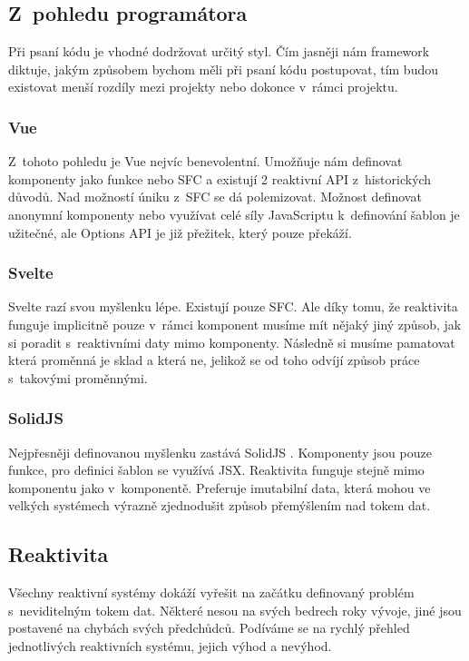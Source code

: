 \documentclass[
  master,
  program=ainf,
  tables=false,
  sourcecodes,
  glossaries,
  index
]{kidiplom}
\begin{document}
\subsection{Z~pohledu programátora}
Při psaní kódu je vhodné dodržovat určitý styl. Čím jasněji nám framework diktuje, jakým způsobem bychom
měli při psaní kódu postupovat, tím budou existovat menší rozdíly mezi projekty nebo dokonce v~rámci projektu.

\subsubsection{Vue}
Z~tohoto pohledu je Vue \cite{vue} nejvíc benevolentní. Umožňuje nám definovat komponenty jako funkce nebo SFC a existují
2 reaktivní API z~historických důvodů. Nad možností úniku z~SFC se dá polemizovat. Možnost definovat anonymní
komponenty nebo využívat celé síly JavaScriptu \cite{js} k~definování šablon je užitečné, ale Options API je již přežitek,
který pouze překáží. 

\subsubsection{Svelte}
Svelte \cite{svelte} razí svou myšlenku lépe. Existují pouze SFC. Ale díky tomu, že reaktivita funguje implicitně pouze v~rámci
komponent musíme mít nějaký jiný způsob, jak si poradit s~reaktivními daty mimo komponenty. Následně si musíme
pamatovat která proměnná je sklad a která ne, jelikož se od toho odvíjí způsob práce s~takovými proměnnými.

\subsubsection{SolidJS}
Nejpřesněji definovanou myšlenku zastává SolidJS \cite{solidjs}. Komponenty jsou pouze funkce, pro definici šablon se využívá
JSX. Reaktivita funguje stejně mimo komponentu jako v~komponentě. Preferuje imutabilní data, která mohou ve 
velkých systémech výrazně zjednodušit způsob přemýšlením nad tokem dat.

\subsection{Reaktivita}
Všechny reaktivní systémy dokáží vyřešit na začátku definovaný problém s~neviditelným tokem dat. 
Některé nesou na svých bedrech roky vývoje, jiné jsou postavené na chybách svých předchůdců. Podíváme se na rychlý
přehled jednotlivých reaktivních systému, jejich výhod a nevýhod.
\end{document}
